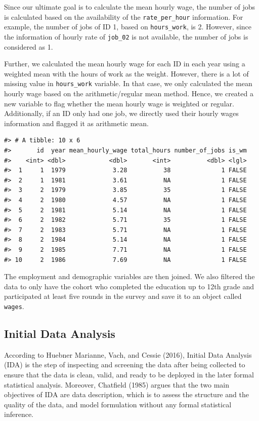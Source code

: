 \documentclass{article}
\begin{document}
Since our ultimate goal is to calculate the mean hourly wage, the number of jobs is calculated based on the availability of the \texttt{rate\_per\_hour} information. For example, the number of jobs of ID 1, based on \texttt{hours\_work}, is 2. However, since the information of hourly rate of \texttt{job\_02} is not available, the number of jobs is considered as 1.

Further, we calculated the mean hourly wage for each ID in each year using a weighted mean with the hours of work as the weight. However, there is a lot of missing value in \texttt{hours\_work} variable. In that case, we only calculated the mean hourly wage based on the arithmetic/regular mean method. Hence, we created a new variable to flag whether the mean hourly wage is weighted or regular. Additionally, if an ID only had one job, we directly used their hourly wages information and flagged it as arithmetic mean.

\begin{verbatim}
#> # A tibble: 10 x 6
#>       id  year mean_hourly_wage total_hours number_of_jobs is_wm
#>    <int> <dbl>            <dbl>       <int>          <dbl> <lgl>
#>  1     1  1979             3.28          38              1 FALSE
#>  2     1  1981             3.61          NA              1 FALSE
#>  3     2  1979             3.85          35              1 FALSE
#>  4     2  1980             4.57          NA              1 FALSE
#>  5     2  1981             5.14          NA              1 FALSE
#>  6     2  1982             5.71          35              1 FALSE
#>  7     2  1983             5.71          NA              1 FALSE
#>  8     2  1984             5.14          NA              1 FALSE
#>  9     2  1985             7.71          NA              1 FALSE
#> 10     2  1986             7.69          NA              1 FALSE
\end{verbatim}

The employment and demographic variables are then joined. We also filtered the data to only have the cohort who completed the education up to 12th grade and participated at least five rounds in the survey and save it to an object called \texttt{wages}.

\hypertarget{initial-data-analysis}{%
\subsection{Initial Data Analysis}\label{initial-data-analysis}}

According to Huebner Marianne, Vach, and Cessie (2016), Initial Data Analysis (IDA) is the step of inspecting and screening the data after being collected to ensure that the data is clean, valid, and ready to be deployed in the later formal statistical analysis. Moreover, Chatfield (1985) argues that the two main objectives of IDA are data description, which is to assess the structure and the quality of the data, and model formulation without any formal statistical inference.
\end{document}
